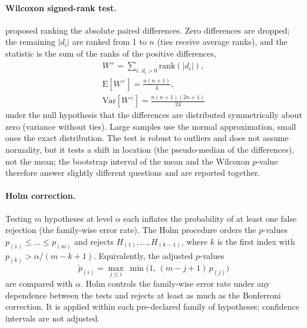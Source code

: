 \paragraph{Wilcoxon signed-rank test.} \citet{wilcoxon1945individual} proposed ranking the absolute paired differences. Zero differences are
dropped; the remaining $|d_i|$ are ranked from 1 to $n$ (ties receive average ranks), and the statistic is the sum of the ranks of the positive
differences,
\begin{equation}
\begin{gathered}
W^{+}=\sum_{i:\,d_i>0}\mathrm{rank}(|d_i|),\\
\mathrm{E}[W^{+}]=\frac{n(n+1)}{4},\\
\mathrm{Var}[W^{+}]=\frac{n(n+1)(2n+1)}{24}
\end{gathered}
\label{eq:bg_wilcoxon}
\end{equation}
under the null hypothesis that the differences are distributed symmetrically about zero (variance without ties). Large samples use the normal
approximation, small ones the exact distribution. The test is robust to outliers and does not assume normality, but it tests a shift in location
(the pseudo-median of the differences), not the mean; the bootstrap interval of the mean and the Wilcoxon $p$-value therefore answer slightly
different questions and are reported together.

\paragraph{Holm correction.} Testing $m$ hypotheses at level $\alpha$ each inflates the probability of at least one false rejection (the
family-wise error rate). The Holm procedure \citep{holm1979simple} orders the $p$-values $p_{(1)}\le\dots\le p_{(m)}$ and rejects
$H_{(1)},\dots,H_{(k-1)}$, where $k$ is the first index with $p_{(k)}>\alpha/(m-k+1)$. Equivalently, the adjusted $p$-values
\begin{equation}
\tilde p_{(i)}=\max_{j\le i}\ \min\big(1,\,(m-j+1)\,p_{(j)}\big)
\label{eq:bg_holm}
\end{equation}
are compared with $\alpha$. Holm controls the family-wise error rate under any dependence between the tests and rejects at least as much as
the Bonferroni correction. It is applied within each pre-declared family of hypotheses; confidence intervals are not adjusted.

